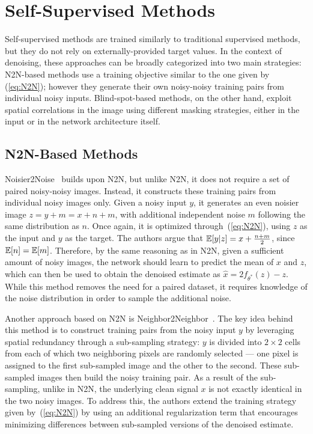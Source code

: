 \section{Self-Supervised Methods}\label{sec:self-supervised}

Self-supervised methods are trained similarly to traditional supervised methods, but they do not rely on externally-provided target values.
In the context of denoising, these approaches can be broadly categorized into two main strategies:
N2N-based methods use a training objective similar to the one given by (\ref{eq:N2N}); however they generate their own noisy-noisy training pairs from individual noisy inputs.
Blind-spot-based methods, on the other hand, exploit spatial correlations in the image using different masking strategies, either in the input or in the network architecture itself.

\subsection{N2N-Based Methods}

Noisier2Noise~\cite{Noisier2Noise} builds upon N2N, but unlike N2N, it does not require a set of paired noisy-noisy images.
Instead, it constructs these training pairs from individual noisy images only.
Given a noisy input $y$, it generates an even noisier image $z = y + m = x + n + m$, with additional independent noise $m$ following the same distribution as $n$.
Once again, it is optimized through~(\ref{eq:N2N}), using $z$ as the input and $y$ as the target.
The authors argue that $\mathbb{E} [y|z] = x + \frac{n + m}{2}$, since $\mathbb{E} [n] = \mathbb{E} [m]$.
Therefore, by the same reasoning as in N2N, given a sufficient amount of noisy images, the network should learn to predict the mean of $x$ and $z$, which can then be used to obtain the denoised estimate as $\hat{x} = 2f_{\theta^*}(z) - z$.
While this method removes the need for a paired dataset, it requires knowledge of the noise distribution in order to sample the additional noise.

Another approach based on N2N is Neighbor2Neighbor~\cite{Neighbor2Neighbor}.
The key idea behind this method is to construct training pairs from the noisy input $y$ by leveraging spatial redundancy through a sub-sampling strategy:
$y$ is divided into $2 \times 2$ cells from each of which two neighboring pixels are randomly selected --- one pixel is assigned to the first sub-sampled image and the other to the second.
These sub-sampled images then build the noisy training pair.
As a result of the sub-sampling, unlike in N2N, the underlying clean signal $x$ is not exactly identical in the two noisy images.
To address this, the authors extend the training strategy given by~(\ref{eq:N2N}) by using an additional regularization term that encourages minimizing differences between sub-sampled versions of the denoised estimate.

